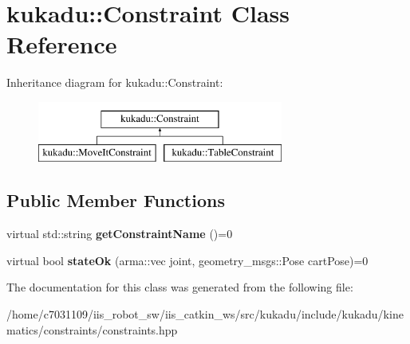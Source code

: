 \hypertarget{classkukadu_1_1Constraint}{\section{kukadu\-:\-:Constraint Class Reference}
\label{classkukadu_1_1Constraint}
}
Inheritance diagram for kukadu\-:\-:Constraint\-:\begin{figure}[H]
\begin{center}
\leavevmode
\includegraphics[height=2.000000cm]{classkukadu_1_1Constraint}
\end{center}
\end{figure}
\subsection*{Public Member Functions}
\begin{DoxyCompactItemize}
\item 
\hypertarget{classkukadu_1_1Constraint_aa3991ff85b8e0496b6193da496370eec}{virtual std\-::string {\bfseries get\-Constraint\-Name} ()=0}\label{classkukadu_1_1Constraint_aa3991ff85b8e0496b6193da496370eec}

\item 
\hypertarget{classkukadu_1_1Constraint_a64f1dfe00ed3a4794ef383f9232d7f1c}{virtual bool {\bfseries state\-Ok} (arma\-::vec joint, geometry\-\_\-msgs\-::\-Pose cart\-Pose)=0}\label{classkukadu_1_1Constraint_a64f1dfe00ed3a4794ef383f9232d7f1c}

\end{DoxyCompactItemize}


The documentation for this class was generated from the following file\-:\begin{DoxyCompactItemize}
\item 
/home/c7031109/iis\-\_\-robot\-\_\-sw/iis\-\_\-catkin\-\_\-ws/src/kukadu/include/kukadu/kinematics/constraints/constraints.\-hpp\end{DoxyCompactItemize}
